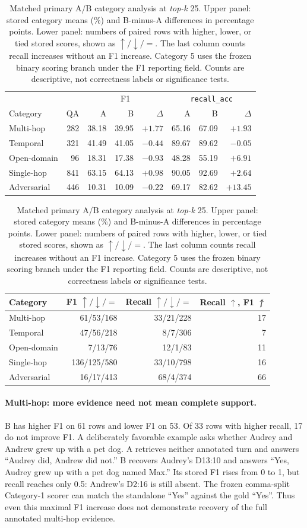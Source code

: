 \documentclass[a4paper,twoside]{article}
\newcommand{\recallacc}{\texttt{recall\_acc}}
\newcommand{\topk}{\textit{top-k}}
\begin{document}
\begin{table}[t]
\centering
\caption{Matched primary A/B category analysis at \topk{} 25.
Upper panel: stored category means (\%) and B-minus-A differences in
percentage points. Lower panel: numbers of paired rows with higher, lower,
or tied stored scores, shown as $\uparrow/\downarrow/=$.
The last column counts recall increases without an F1 increase.
Category 5 uses the frozen binary scoring branch under the F1 reporting
field. Counts are descriptive, not correctness labels or significance tests.}
\label{tab:category-paired}
\small
\begin{tabular*}{\textwidth}{@{\extracolsep{\fill}}lrrrrrrr@{}}
\toprule
 & & \multicolumn{3}{c}{F1} & \multicolumn{3}{c}{\recallacc{}} \\
Category & QA & A & B & $\Delta$ & A & B & $\Delta$ \\
\midrule
Multi-hop & 282 & 38.18 & 39.95 & $+1.77$ & 65.16 & 67.09 & $+1.93$ \\
Temporal & 321 & 41.49 & 41.05 & $-0.44$ & 89.67 & 89.62 & $-0.05$ \\
Open-domain & 96 & 18.31 & 17.38 & $-0.93$ & 48.28 & 55.19 & $+6.91$ \\
Single-hop & 841 & 63.15 & 64.13 & $+0.98$ & 90.05 & 92.69 & $+2.64$ \\
Adversarial & 446 & 10.31 & 10.09 & $-0.22$ & 69.17 & 82.62 & $+13.45$ \\
\bottomrule
\end{tabular*}
\vspace{1mm}
\begin{tabular*}{\textwidth}{@{\extracolsep{\fill}}lrrr@{}}
\toprule
Category & F1 $\uparrow/\downarrow/=$ & Recall $\uparrow/\downarrow/=$ & Recall $\uparrow$, F1 $\not\uparrow$ \\
\midrule
Multi-hop & 61/53/168 & 33/21/228 & 17 \\
Temporal & 47/56/218 & 8/7/306 & 7 \\
Open-domain & 7/13/76 & 12/1/83 & 11 \\
Single-hop & 136/125/580 & 33/10/798 & 16 \\
Adversarial & 16/17/413 & 68/4/374 & 66 \\
\bottomrule
\end{tabular*}
\end{table}

\paragraph{Multi-hop: more evidence need not mean complete support.}
B has higher F1 on 61 rows and lower F1 on 53. Of 33 rows with higher recall,
17 do not improve F1. A deliberately favorable example asks whether Audrey
and Andrew grew up with a pet dog. A retrieves neither annotated turn and
answers ``Audrey did, Andrew did not.'' B recovers Audrey's D13:10 and
answers ``Yes, Audrey grew up with a pet dog named Max.'' Its stored F1
rises from 0 to 1, but recall reaches only 0.5: Andrew's D2:16 is still
absent. The frozen comma-split Category-1 scorer can match the standalone
``Yes'' against the gold ``Yes''. Thus even this maximal F1 increase does
not demonstrate recovery of the full annotated multi-hop evidence.
\end{document}
